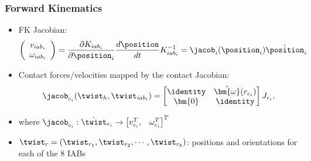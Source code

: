 \begin{frame}
	\frametitle{Forward Kinematics}
	\begin{itemize}
	\item FK  Jacobian:\begin{align}
	\left(\begin{array}{c}
	v_{{iab}_i} \\ \omega_{{iab}_i}
	\end{array}\right) = \frac{\partial K_{{iab}_i}}{\partial \position_{i}} \frac{d \position}{d t} K_{{iab}_i}^{-1} = \jacob_{i}(\position_{i})\dot{\position}_{i}
	\end{align}
%
	\vspace{.1in}
	\item Contact forces/velocities mapped by the contact Jacobian:
	\begin{align}
	\jacob_{c_i}(\twist_h, \twist_{{iab}_i}) = \begin{bmatrix}
	\identity & \hat{\bm{\omega}}(r_{c_i}) \\
	\bm{0} & \identity 
	\end{bmatrix} J_{r_i},
	\end{align}
	\vspace{.1in}
	\item where  $\jacob_{c_i}: \dot{\twist}_{r_i} \rightarrow \begin{bmatrix}
	v_{c_i}^T, & \omega_{c_i}^T
	\end{bmatrix}^T$
	\vspace{.1in}
	\item $\twist_r = \left(\twist_{r_1}, \twist_{r_2}, \cdots, \twist_{r_8}\right)$: positions and orientations for each of the $8$ IABs
\end{itemize}
\end{frame}

